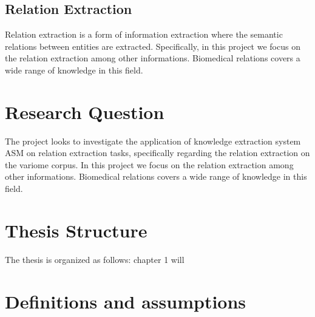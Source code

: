\subsection{Relation Extraction} 
Relation extraction is a form of information extraction where the semantic relations between entities are extracted.
Specifically, in this project we focus on the relation extraction among other informations. Biomedical relations covers a wide range of knowledge in this field.

\section{Research Question}\label{section1.2}%
The project looks to investigate the application of  knowledge extraction system ASM on relation extraction tasks, specifically regarding the relation extraction on the variome corpus.
In this project we focus on the relation extraction among other informations. Biomedical relations covers a wide range of knowledge in this field.


\section{Thesis Structure}\label{section1.3} %
The thesis is organized as follows: chapter 1 will


\section{Definitions and assumptions}

